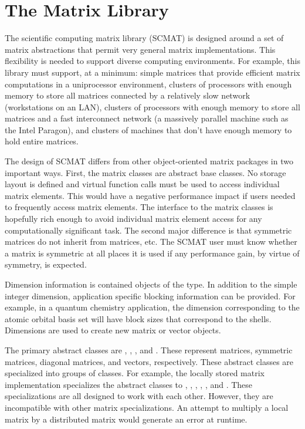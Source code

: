 
\chapter{The Matrix Library}

The scientific computing matrix library (SCMAT) is designed around a set
of matrix abstractions that permit very general matrix implementations.
This flexibility is needed to support diverse computing environments.
For example, this library must support, at a minimum: simple matrices
that provide efficient matrix computations in a uniprocessor
environment, clusters of processors with enough memory to store all
matrices connected by a relatively slow network (workstations on an
LAN), clusters of processors with enough memory to store all matrices
and a fast interconnect network (a massively parallel machine such as
the Intel Paragon), and clusters of machines that don't have enough
memory to hold entire matrices.

The design of SCMAT differs from other object-oriented matrix packages
in two important ways.  First, the matrix classes are abstract base
classes.  No storage layout is defined and virtual function calls must
be used to access individual matrix elements.  This would have a
negative performance impact if users needed to frequently access matrix
elements.  The interface to the matrix classes is hopefully rich enough
to avoid individual matrix element access for any computationally
significant task.  The second major difference is that symmetric
matrices do not inherit from matrices, etc.  The SCMAT user must know
whether a matrix is symmetric at all places it is used if any
performance gain, by virtue of symmetry, is expected.

Dimension information is contained objects of the 
type.  In addition to the simple integer dimension, application specific
blocking information can be provided.  For example, in a quantum chemistry
application, the dimension corresponding to the atomic orbital basis set
will have block sizes that correspond to the shells.  Dimensions are used
to create new matrix or vector objects.

The primary abstract classes are ,
, , and .
These represent matrices, symmetric matrices, diagonal matrices, and
vectors, respectively.  These abstract classes are specialized into groups
of classes.  For example, the locally stored matrix implementation
specializes the abstract classes to ,
, ,
, , and
.  These specializations are all designed to
work with each other.  However, they are incompatible with other matrix
specializations.  An attempt to multiply a local matrix by a distributed
matrix would generate an error at runtime.

